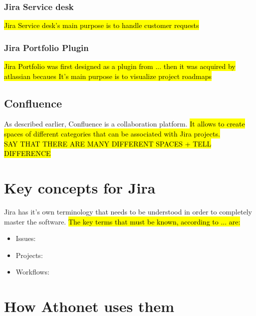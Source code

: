 		\subsubsection{Jira Service desk}
			\hl{Jira Service desk's main purpose is to handle customer requests}

		\subsubsection{Jira Portfolio Plugin}
			\hl{Jira Portfolio was first designed as a plugin from ... then it was acquired by atlassian becaues
			It's main purpose is to visualize project roadmaps}
		
	\subsection{Confluence}
		As described earlier, Confluence is a collaboration platform.
		\hl{It allows to create spaces of different categories that can be associated with Jira projects.\\SAY THAT THERE ARE MANY DIFFERENT SPACES + TELL DIFFERENCE}
		
		
\section{Key concepts for Jira}
	Jira has it's own terminology that needs to be understood in order to completely master the software.	
	\hl{The key terms that must be known, according to ... are:}
	\begin{itemize}
		\item Issues: 
		\item Projects: 
		\item Workflows: 
	\end{itemize}
	
\section{How Athonet uses them}
	


